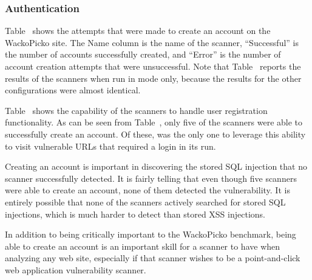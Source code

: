 
\subsubsection{Authentication}

Table~ shows the attempts that were made to
create an account on the WackoPicko site. The Name column is the name
of the scanner, ``Successful'' is the number of accounts successfully
created, and ``Error'' is the number of account creation attempts that
were unsuccessful. Note that
Table~ reports the results of the scanners when run in
\initial{} mode only, because the results for the other configurations were
almost identical.

Table~ shows the capability of
the scanners to handle user registration functionality. As can be seen from
Table~, only five of the scanners were able to successfully
create an account. Of these, \hailstorm{} was the only one to leverage
this ability to visit vulnerable URLs that required a login in its
\initial{} run.

Creating an account is important in discovering the stored SQL injection that
no scanner successfully detected. It is fairly telling that even though five
scanners were able to create an account, none of them detected the vulnerability. It
is entirely possible that none of the scanners actively searched for stored SQL
injections, which is much harder to detect than stored XSS injections. 


In addition to being critically important to the WackoPicko benchmark, being
able to create an account is an important skill for a scanner to have when
analyzing any web site, especially if that scanner wishes to be a
point-and-click web application vulnerability scanner. 

